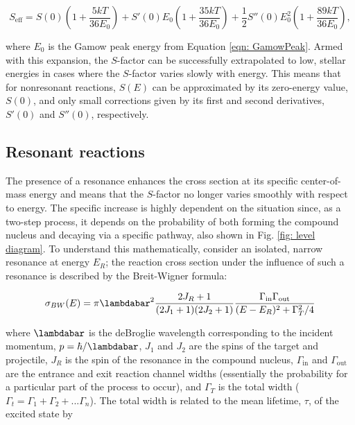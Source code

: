 \begin{equation}
S_{\text{eff}} = S(0) \left( 1 + \dfrac{5 k T}{36 E_{0}}   \right) + S'(0) E_{0} \left( 1 + \dfrac{35 k T}{36 E_{0}}   \right)  + \dfrac{1}{2} S''(0) E_{0}^{2} \left( 1 + \dfrac{89 k T}{36 E_{0}}   \right),
\label{eqn: Seff}
\end{equation}

\noindent where $E_{0}$ is the Gamow peak energy from Equation \ref{eqn: GamowPeak}. Armed with this expansion, the $S$-factor can be successfully extrapolated to low, stellar energies in cases where the $S$-factor varies slowly with energy. This means that for nonresonant reactions, $S(E)$ can be approximated by its zero-energy value, $S(0)$, and only small corrections given by its first and second derivatives, $S'(0)$ and $S''(0)$, respectively. 




\subsection{Resonant reactions}

The presence of a resonance enhances the cross section at its specific center-of-mass energy and means that the $S$-factor no longer varies smoothly with respect to energy. The specific increase is highly dependent on the situation since, as a two-step process, it depends on the probability of both forming the compound nucleus and decaying via a specific pathway, also shown in Fig. \ref{fig: level diagram}. To understand this mathematically, consider an isolated, narrow resonance at energy $E_{R}$; the reaction cross section under the influence of such a resonance is described by the Breit-Wigner formula:

\begin{equation}
\label{eqn: BreitWigner}
\sigma_{BW}(E) = \pi \lambdabar^{2} \frac{2J_R+1}{(2J_1+1)(2J_2+1)}\frac{\Gamma_\mathrm{in}\Gamma_\mathrm{out}}{(E-E_{R})^2+\Gamma_{T}^2/4}
\end{equation}

where $\lambdabar$ is the deBroglie wavelength corresponding to the incident momentum, $p=\hbar/\lambdabar$, $J_1$ and $J_2$ are the spins of the target and projectile, $J_R$ is the spin of the resonance in the compound nucleus, $\Gamma_\mathrm{in}$ and $\Gamma_\mathrm{out}$ are the entrance and exit reaction channel widths (essentially the probability for a particular part of the process to occur), and $\Gamma_T$ is the total width ($\Gamma_t = \Gamma_1 + \Gamma_2 + ... \Gamma_n$). The total width is related to the mean lifetime, $\tau$, of the excited state by 

